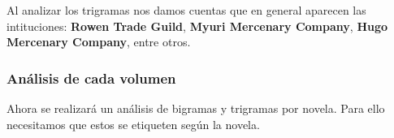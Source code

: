 \documentclass[
]{article}
\newenvironment{Shaded}{\begin{snugshade}}{\end{snugshade}}
\newcommand{\ControlFlowTok}[1]{\textcolor[rgb]{0.13,0.29,0.53}{\textbf{#1}}}
\newcommand{\DataTypeTok}[1]{\textcolor[rgb]{0.13,0.29,0.53}{#1}}
\newcommand{\DecValTok}[1]{\textcolor[rgb]{0.00,0.00,0.81}{#1}}
\newcommand{\KeywordTok}[1]{\textcolor[rgb]{0.13,0.29,0.53}{\textbf{#1}}}
\newcommand{\NormalTok}[1]{#1}
\newcommand{\OperatorTok}[1]{\textcolor[rgb]{0.81,0.36,0.00}{\textbf{#1}}}
\newcommand{\StringTok}[1]{\textcolor[rgb]{0.31,0.60,0.02}{#1}}
\begin{document}
Al analizar los trigramas nos damos cuentas que en general aparecen las
intituciones: \textbf{Rowen Trade Guild}, \textbf{Myuri Mercenary
Company}, \textbf{Hugo Mercenary Company}, entre otros.

\hypertarget{anuxe1lisis-de-cada-volumen}{%
\subsubsection{\texorpdfstring{\textbf{Análisis de cada
volumen}}{Análisis de cada volumen}}\label{anuxe1lisis-de-cada-volumen}}

Ahora se realizará un análisis de bigramas y trigramas por novela. Para
ello necesitamos que estos se etiqueten según la novela.

\begin{Shaded}
\end{Shaded}
\end{document}
